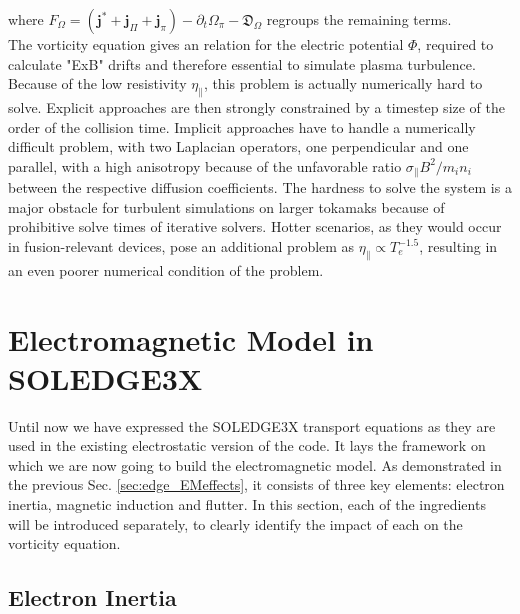 where $F_\Omega = \left(\mathbf{j}^* + \mathbf{j}_{\Pi} + \mathbf{j}_{\pi}\right) - \partial_t \Omega_\pi  - \mathfrak{D}_\Omega$ regroups the remaining terms. \\
The vorticity equation gives an relation for the electric potential $\Phi$, required to calculate "ExB" drifts and therefore essential to simulate plasma turbulence. Because of the low resistivity $\eta_\parallel$, this problem is actually numerically hard to solve. Explicit approaches are then strongly constrained by a timestep size of the order of the collision time. Implicit approaches have to handle a numerically difficult problem, with two Laplacian operators, one perpendicular and one parallel, with a high anisotropy because of the unfavorable ratio $\sigma_\parallel B^2 / m_in_i$ between the respective diffusion coefficients. The hardness to solve the system is a major obstacle for turbulent simulations on larger tokamaks because of prohibitive solve times of iterative solvers. Hotter scenarios, as they would occur in fusion-relevant devices, pose an additional problem as $\eta_\parallel\propto T_e^{-1.5}$, resulting in an even poorer numerical condition of the problem. 



\section{Electromagnetic Model in SOLEDGE3X}
\label{sec:S3X_electromagneticModel}

Until now we have expressed the SOLEDGE3X transport equations as they are used in the existing electrostatic version of the code. It lays the framework on which we are now going to build the electromagnetic model. As demonstrated in the previous Sec. \ref{sec:edge_EMeffects}, it consists of three key elements: electron inertia, magnetic induction and flutter. In this section, each of the ingredients will be introduced separately, to clearly identify the impact of each on the vorticity equation. 


\subsection{Electron Inertia}
\label{ssec:ModelElectronInertia}


